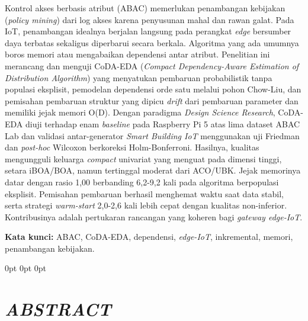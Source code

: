 %

\vspace{43.2pt}

\justifying

Kontrol akses berbasis atribut (ABAC) memerlukan penambangan kebijakan (\textit{policy mining}) dari log akses karena penyusunan mahal dan rawan galat.
Pada IoT, penambangan idealnya berjalan langsung pada perangkat \textit{edge} bersumber daya terbatas sekaligus diperbarui secara berkala.
Algoritma yang ada umumnya boros memori atau mengabaikan dependensi antar atribut.
Penelitian ini merancang dan menguji CoDA-EDA (\textit{Compact Dependency-Aware Estimation of Distribution Algorithm}) yang menyatukan pembaruan probabilistik tanpa populasi eksplisit, pemodelan dependensi orde satu melalui pohon Chow-Liu, dan pemisahan pembaruan struktur yang dipicu \textit{drift} dari pembaruan parameter dan memiliki jejak memori O(D).
Dengan paradigma \textit{Design Science Research}, CoDA-EDA diuji terhadap enam \textit{baseline} pada Raspberry Pi 5 atas lima dataset ABAC Lab dan validasi antar-generator \textit{Smart Building IoT} menggunakan uji Friedman dan \textit{post-hoc} Wilcoxon berkoreksi Holm-Bonferroni.
Hasilnya, kualitas mengungguli keluarga \textit{compact} univariat yang menguat pada dimensi tinggi, setara iBOA/BOA, namun tertinggal moderat dari ACO/UBK.
Jejak memorinya datar dengan rasio 1,00 berbanding 6,2-9,2 kali pada algoritma berpopulasi eksplisit.
Pemisahan pembaruan berhasil menghemat waktu saat data stabil, serta strategi \textit{warm-start} 2,0-2,6 kali lebih cepat dengan kualitas non-inferior.
Kontribusinya adalah pertukaran rancangan yang koheren bagi \textit{gateway edge-IoT}.

\vspace{14.4pt}
\textbf{Kata kunci:} ABAC, CoDA-EDA, dependensi, \textit{edge-IoT}, inkremental, memori, penambangan kebijakan.

\endgroup

\newpage

\begingroup
\titlespacing*{\chapter}
  {0pt}
  {0pt}
  {0pt}

\chapter*{\textit{ABSTRACT}}

